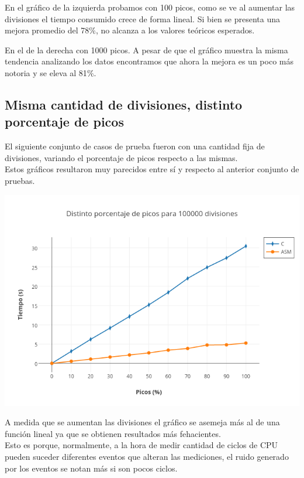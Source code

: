 En el gráfico de la izquierda probamos con 100 picos, como se ve al aumentar las divisiones el tiempo consumido crece de forma lineal. Si bien se presenta una mejora promedio del 78$\%$, no alcanza a los valores teóricos esperados.

En el de la derecha con 1000 picos. A pesar de que el gráfico muestra la misma tendencia analizando los datos encontramos que ahora la mejora es un poco más notoria y se eleva al 81$\%$.

\newpage

\subsection{Misma cantidad de divisiones, distinto porcentaje de picos}

El siguiente conjunto de casos de prueba fueron con una cantidad fija de divisiones, variando el porcentaje de picos respecto a las mismas.\\

Estos gráficos resultaron muy parecidos entre sí y respecto al anterior conjunto de pruebas. 

\includegraphics[scale=0.6]{imagenes/distintosPicos100000divisiones.png} 

A medida que se aumentan las divisiones el gráfico se asemeja más al de una función lineal ya que se obtienen resultados más fehacientes.\\

Esto es porque, normalmente, a la hora de medir cantidad de ciclos de CPU pueden suceder diferentes eventos que alteran las mediciones, el ruido generado por los eventos se notan más si son pocos ciclos.

